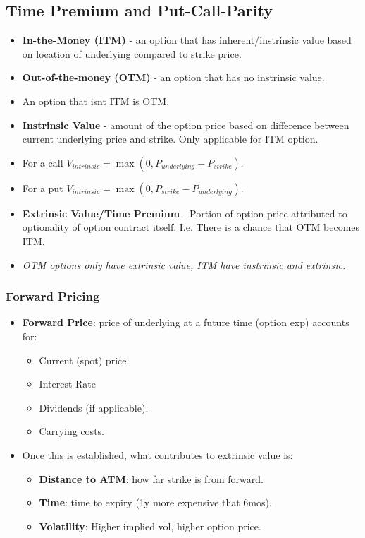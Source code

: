\documentclass{article}
\begin{document}
\subsection{Time Premium and Put-Call-Parity}
\begin{itemize}
    \item \textbf{In-the-Money (ITM)} - an option that has inherent/instrinsic
    value based on location of underlying compared to strike price.
    \item \textbf{Out-of-the-money (OTM)} - an option that has no instrinsic
    value.
    \item An option that isnt ITM is OTM.
    \item \textbf{Instrinsic Value} - amount of the option price based on
    difference between current underlying price and strike. Only applicable for
    ITM option.
    \item For a call $V_{intrinsic} = \max(0, P_{underlying} - P_{strike})$.
    \item For a put $V_{intrinsic} = \max(0, P_{strike} - P_{underlying})$.
    \item \textbf{Extrinsic Value/Time Premium} - Portion of option price 
    attributed to optionality of option contract itself. I.e. There is a chance
    that OTM becomes ITM.
    \item \textit{OTM options only have extrinsic value, ITM have instrinsic and
    extrinsic.}
\end{itemize}

\subsubsection{Forward Pricing}
\begin{itemize}
    \item \textbf{Forward Price}: price of underlying at a future time (option exp)
    accounts for:
    \begin{itemize}
        \item Current (spot) price.
        \item Interest Rate 
        \item Dividends (if applicable).
        \item Carrying costs.
    \end{itemize}
    \item Once this is established, what contributes to extrinsic value is:
    \begin{itemize}
        \item \textbf{Distance to ATM}: how far strike is from forward.
        \item \textbf{Time}: time to expiry (1y more expensive that 6mos).
        \item \textbf{Volatility}: Higher implied vol, higher option price.
    \end{itemize}
\end{itemize}
\end{document}
